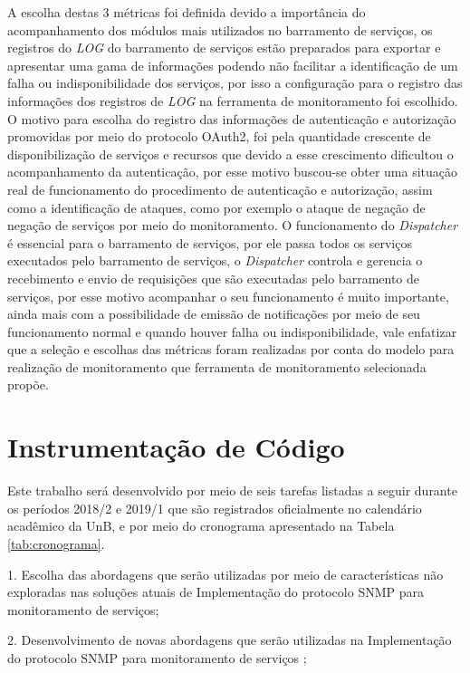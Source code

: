A escolha destas 3 métricas foi definida devido a importância do acompanhamento dos módulos mais utilizados no barramento de serviços, os registros do \textit{LOG} do barramento de serviços estão preparados para exportar e apresentar uma gama de informações podendo não facilitar a identificação de um falha ou indisponibilidade dos serviços, por isso a configuração para o registro das informações dos registros de \textit{LOG} na ferramenta de monitoramento foi escolhido. O motivo para escolha do registro das informações de autenticação e autorização promovidas por meio do protocolo OAuth2, foi pela quantidade crescente de disponibilização de serviços e recursos que devido a esse crescimento dificultou o acompanhamento da autenticação, por esse motivo buscou-se obter uma situação real de funcionamento do procedimento de autenticação e autorização, assim como a identificação de ataques, como por exemplo o ataque de negação de negação de serviços por meio do monitoramento. O funcionamento do \textit{Dispatcher} é essencial para o barramento de serviços, por ele passa todos os serviços executados pelo barramento de serviços, o \textit{Dispatcher} controla e gerencia o recebimento e envio de requisições que são executadas pelo barramento de serviços, por esse motivo acompanhar o seu funcionamento é muito importante, ainda mais com a possibilidade de emissão de notificações por meio de seu funcionamento normal e quando houver falha ou indisponibilidade, vale enfatizar que a seleção e escolhas das métricas foram realizadas por conta do modelo para realização de monitoramento que ferramenta de monitoramento selecionada propõe.   


\section{Instrumentação de Código}

Este trabalho será desenvolvido por meio de seis tarefas listadas a seguir durante os períodos 2018/2 e 2019/1 que são registrados oficialmente no calendário acadêmico da UnB, e por meio do cronograma apresentado na Tabela \ref{tab:cronograma}.

	1. Escolha das abordagens que serão utilizadas por meio de características não exploradas nas soluções atuais de Implementação do protocolo SNMP para monitoramento de serviços;
  
  2. Desenvolvimento de novas abordagens que serão utilizadas na Implementação do protocolo SNMP para monitoramento de serviços ;
    

